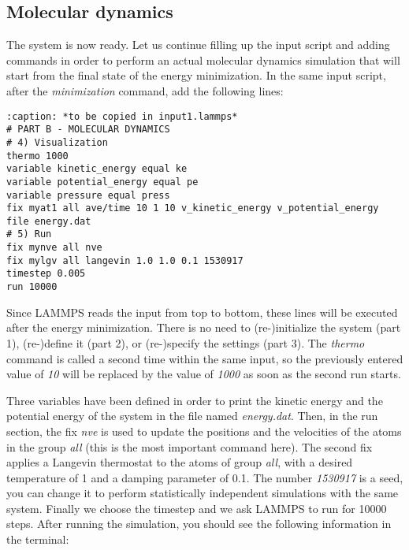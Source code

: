 \subsection{Molecular dynamics}
\noindent 
The system is now ready. Let us continue filling up the
input script and adding commands in order to perform an actual molecular dynamics
simulation that will start from the final state of the energy minimization.
In the same input script, after the \textit{minimization} command, add the following
lines:

\begin{verbatim}
:caption: *to be copied in input1.lammps*
# PART B - MOLECULAR DYNAMICS
# 4) Visualization
thermo 1000
variable kinetic_energy equal ke
variable potential_energy equal pe
variable pressure equal press
fix myat1 all ave/time 10 1 10 v_kinetic_energy v_potential_energy file energy.dat
# 5) Run
fix mynve all nve
fix mylgv all langevin 1.0 1.0 0.1 1530917
timestep 0.005
run 10000
\end{verbatim}

\noindent Since LAMMPS reads the input from top to
bottom, these lines will be executed after the energy
minimization. There is no need to (re-)initialize the system
(part 1), (re-)define it (part 2), or (re-)specify the settings
(part 3). The \textit{thermo} command is called a second time within the 
same input, so the previously entered value of \textit{10} will be replaced
by the value of \textit{1000} as soon as the second run starts.

Three variables have been defined in order
to print the kinetic energy and the potential energy 
of the system in the file named \textit{energy.dat}. Then,
in the run section, the fix \textit{nve} is used to update the
positions and the velocities of the atoms in the group
\textit{all} (this is the most important command here). The second
fix applies a Langevin thermostat to the atoms of group
\textit{all}, with a desired temperature of 1 and a damping
parameter of 0.1. The number \textit{1530917} is a seed, you can
change it to perform statistically independent simulations
with the same system. Finally we choose the timestep
and we ask LAMMPS to run for 10000 steps. After running
the simulation, you should see the following information in
the terminal:

